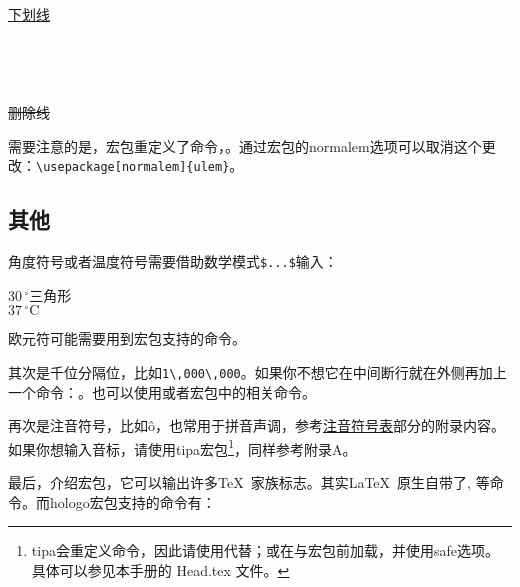 \begin{codeshow}
\uline{下划线} \\
 \\
 \\
 \\
 \\
\sout{删除线} \\
\end{codeshow}

需要注意的是，宏包重定义了命令，。通过宏包的normalem选项可以取消这个更改：\verb|\usepackage[normalem]{ulem}|。

\subsection{其他}
角度符号或者温度符号需要借助数学模式\verb|$...$|输入：

\begin{codeshow}
$30\,^{\circ}$三角形 \\
$37\,^{\circ}\mathrm{C}$
\end{codeshow}

欧元符可能需要用到宏包支持的命令。

其次是千位分隔位，比如\verb|1\,000\,000|。如果你不想它在中间断行就在外侧再加上一个命令：。也可以使用或者宏包中的相关命令。

再次是注音符号，比如\^o，也常用于拼音声调，参考\hyperref[app:phonetic]{注音符号表}部分的附录内容。如果你想输入音标，请使用tipa宏包\footnote{tipa会重定义\latexline{!}命令，因此请使用代替；或在与宏包前加载，并使用safe选项。具体可以参见本手册的 Head.tex 文件。}，同样参考附录A。

最后，介绍宏包，它可以输出许多\TeX\ 家族标志。其实\LaTeX\ 原生自带了, 等命令。而hologo宏包支持的命令有：

\begin{codeshow}
 
\end{codeshow}

